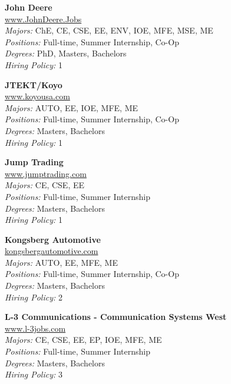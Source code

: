 \documentclass[twoside]{article}
\begin{document}
\begin{center}
\begin{multicols}{3}
\begin{minipage}{.9\columnwidth}{\Large\bf John Deere }\\
	\url{www.JohnDeere.Jobs}\\
	\emph{Majors:} ChE, CE, CSE, EE, ENV, IOE, MFE, MSE, ME\\
	\emph{Positions:} Full-time, Summer Internship, Co-Op\\
	\emph{Degrees:} PhD, Masters, Bachelors\\
	\emph{Hiring Policy:} 1\\
\end{minipage}
 
\begin{minipage}{.9\columnwidth}{\Large\bf JTEKT/Koyo }\\
	\url{www.koyousa.com}\\
	\emph{Majors:} AUTO, EE, IOE, MFE, ME\\
	\emph{Positions:} Full-time, Summer Internship, Co-Op\\
	\emph{Degrees:} Masters, Bachelors\\
	\emph{Hiring Policy:} 1\\
\end{minipage}
 
\begin{minipage}{.9\columnwidth}{\Large\bf Jump Trading }\\
	\url{www.jumptrading.com}\\
	\emph{Majors:} CE, CSE, EE\\
	\emph{Positions:} Full-time, Summer Internship\\
	\emph{Degrees:} Masters, Bachelors\\
	\emph{Hiring Policy:} 1\\
\end{minipage}
 
\begin{minipage}{.9\columnwidth}{\Large\bf Kongsberg Automotive }\\
	\url{kongsbergautomotive.com}\\
	\emph{Majors:} AUTO, EE, MFE, ME\\
	\emph{Positions:} Full-time, Summer Internship, Co-Op\\
	\emph{Degrees:} Masters, Bachelors\\
	\emph{Hiring Policy:} 2\\
\end{minipage}
 
\begin{minipage}{.9\columnwidth}{\Large\bf L-3 Communications - Communication Systems West }\\
	\url{www.l-3jobs.com}\\
	\emph{Majors:} CE, CSE, EE, EP, IOE, MFE, ME\\
	\emph{Positions:} Full-time, Summer Internship\\
	\emph{Degrees:} Masters, Bachelors\\
	\emph{Hiring Policy:} 3\\
\end{minipage}
 

\end{multicols}
\end{center}
\end{document}
